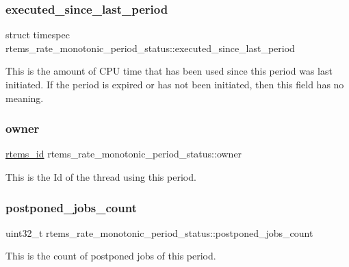 \subsubsection{\texorpdfstring{executed\_since\_last\_period}{executed\_since\_last\_period}}
{\footnotesize\ttfamily struct timespec rtems\+\_\+rate\+\_\+monotonic\+\_\+period\+\_\+status\+::executed\+\_\+since\+\_\+last\+\_\+period}

This is the amount of C\+PU time that has been used since this period was last initiated. If the period is expired or has not been initiated, then this field has no meaning. \mbox{\label{structrtems__rate__monotonic__period__status_ad255662d0fe541bf512da8ee2d1a14ec}} 
\subsubsection{\texorpdfstring{owner}{owner}}
{\footnotesize\ttfamily \mbox{\hyperlink{group__ClassicTasks_gab20892b814dced7dd4e5b9bf42becd57}{rtems\+\_\+id}} rtems\+\_\+rate\+\_\+monotonic\+\_\+period\+\_\+status\+::owner}

This is the Id of the thread using this period. \mbox{\label{structrtems__rate__monotonic__period__status_a488e2a6d7a15d2c73716661fd9eb92d5}} 
\subsubsection{\texorpdfstring{postponed\_jobs\_count}{postponed\_jobs\_count}}
{\footnotesize\ttfamily uint32\+\_\+t rtems\+\_\+rate\+\_\+monotonic\+\_\+period\+\_\+status\+::postponed\+\_\+jobs\+\_\+count}

This is the count of postponed jobs of this period. \mbox{\label{structrtems__rate__monotonic__period__status_a66b584c6840c2e2ea134e2fa72789039}} 

